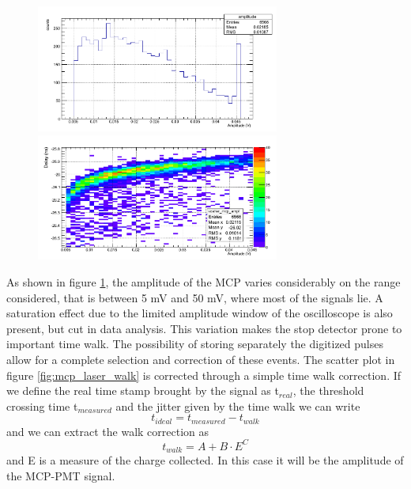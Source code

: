 \begin{figure}[htbp]
\begin{center}
\includegraphics[width=8cm]{../Pictures/Chapter_8/amp_MCP.png}
\includegraphics[width=8cm]{../Pictures/Chapter_8/time_walk_mcp.png}
\end{center}
\caption[]{}
\label{fig:mcp_laser}
\end{figure}
As shown in figure \ref{fig:mcp_laser}, the amplitude of the MCP varies considerably on the range considered, that is between 5 mV and 50 mV, where most of the signals lie. A saturation effect due to the limited amplitude window of the oscilloscope is also present, but cut in data analysis. This variation makes the stop detector prone to important time walk. 
The possibility of storing separately the digitized pulses allow for a complete selection and correction of these events. The scatter plot in figure \ref{fig:mcp_laser_walk} is corrected through a simple time walk correction.
If we define the real time stamp brought by the signal as t$_{real}$, the threshold crossing time t$_{measured}$ and the jitter given by the time walk we can write
\begin{equation}
t_{ideal} = t_{measured} - t_{walk}
\end{equation}
and we can extract the walk correction as
\begin{equation}
t_{walk} = A + B\cdot E^{C}
\end{equation}
and E is a measure of the charge collected. In this case it will be the amplitude of the MCP-PMT signal.
